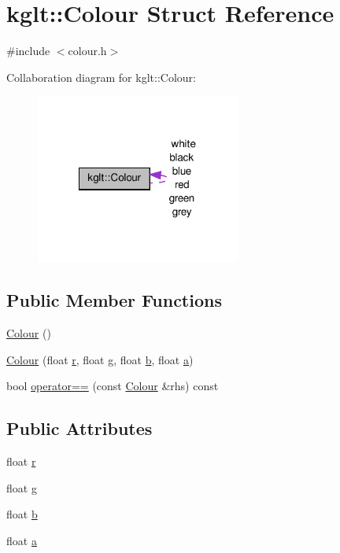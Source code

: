 \hypertarget{structkglt_1_1_colour}{\section{kglt\-:\-:Colour Struct Reference}
\label{structkglt_1_1_colour}
}


{\ttfamily \#include $<$colour.\-h$>$}



Collaboration diagram for kglt\-:\-:Colour\-:\nopagebreak
\begin{figure}[H]
\begin{center}
\leavevmode
\includegraphics[width=191pt]{structkglt_1_1_colour__coll__graph}
\end{center}
\end{figure}
\subsection*{Public Member Functions}
\begin{DoxyCompactItemize}
\item 
\hyperlink{structkglt_1_1_colour_aedf0a0f61429632d94e66ce9d6608449}{Colour} ()
\item 
\hyperlink{structkglt_1_1_colour_aa00042979e488d2f86c410533cd94d73}{Colour} (float \hyperlink{structkglt_1_1_colour_ae1ce44c240711d729ea042c198ecb6d4}{r}, float \hyperlink{structkglt_1_1_colour_ae5601b361c9c92020390b3883662f8a1}{g}, float \hyperlink{structkglt_1_1_colour_a124eb55eb048ac50b2ac2bb9901dc9a2}{b}, float \hyperlink{structkglt_1_1_colour_a477f20a3effe23ae4ed757667de4e9ca}{a})
\item 
bool \hyperlink{structkglt_1_1_colour_a0b58803e4dec68e37dde18b908af5802}{operator==} (const \hyperlink{structkglt_1_1_colour}{Colour} \&rhs) const 
\end{DoxyCompactItemize}
\subsection*{Public Attributes}
\begin{DoxyCompactItemize}
\item 
float \hyperlink{structkglt_1_1_colour_ae1ce44c240711d729ea042c198ecb6d4}{r}
\item 
float \hyperlink{structkglt_1_1_colour_ae5601b361c9c92020390b3883662f8a1}{g}
\item 
float \hyperlink{structkglt_1_1_colour_a124eb55eb048ac50b2ac2bb9901dc9a2}{b}
\item 
float \hyperlink{structkglt_1_1_colour_a477f20a3effe23ae4ed757667de4e9ca}{a}
\end{DoxyCompactItemize}
